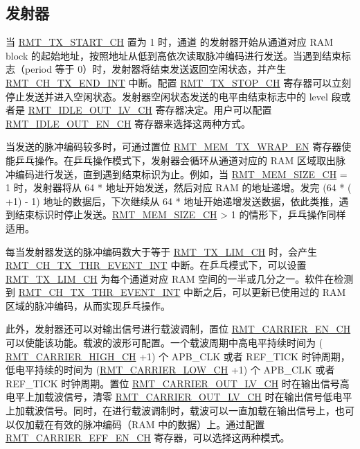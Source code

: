 \documentclass[main\_\_CN.tex]{subfiles}
\begin{document}
\subsection{发射器}
当 \hyperref[fielddesc:RMTREGTXSTARTCHN]{RMT\_TX\_START\_CH} 置为 1 时，通道  的发射器开始从通道对应 RAM block 的起始地址，按照地址从低到高依次读取脉冲编码进行发送。当遇到结束标志（period 等于 0）时，发射器将结束发送返回空闲状态，并产生 \hyperref[int:RMTCHnTXENDINT]{RMT\_CH\_TX\_END\_INT} 中断。配置 \hyperref[fielddesc:RMTREGTXSTOPCHN]{RMT\_TX\_STOP\_CH} 寄存器可以立刻停止发送并进入空闲状态。发射器空闲状态发送的电平由结束标志中的 level 段或者是 \hyperref[fielddesc:RMTREGIDLEOUTLVCHN]{RMT\_IDLE\_OUT\_LV\_CH} 寄存器决定。用户可以配置 \hyperref[fielddesc:RMTREGIDLEOUTENCHN]{RMT\_IDLE\_OUT\_EN\_CH} 寄存器来选择这两种方式。

当发送的脉冲编码较多时，可通过置位 \hyperref[fielddesc:RMTREGMEMTXWRAPEN]{RMT\_MEM\_TX\_WRAP\_EN} 寄存器使能乒乓操作。在乒乓操作模式下，发射器会循环从通道对应的 RAM 区域取出脉冲编码进行发送，直到遇到结束标识为止。例如，当 \hyperref[fielddesc:RMTREGMEMSIZECHN]{RMT\_MEM\_SIZE\_CH} = 1 时，发射器将从 64 *  地址开始发送，然后对应 RAM 的地址递增。发完 (64 * ( +1) - 1) 地址的数据后，下次继续从 64 *  地址开始递增发送数据，依此类推，遇到结束标识时停止发送。\hyperref[fielddesc:RMTREGMEMSIZECHN]{RMT\_MEM\_SIZE\_CH} > 1 的情形下，乒乓操作同样适用。

每当发射器发送的脉冲编码数大于等于 \hyperref[fielddesc:RMTREGTXLIMCHN]{RMT\_TX\_LIM\_CH} 时，会产生 \hyperref[int:RMTCHnTXTHREVENTINT]{RMT\_CH\_TX\_THR\_EVENT\_INT} 中断。在乒乓模式下，可以设置 \hyperref[fielddesc:RMTREGTXLIMCHN]{RMT\_TX\_LIM\_CH} 为每个通道对应 RAM 空间的一半或几分之一。软件在检测到 \hyperref[int:RMTCHnTXTHREVENTINT]{RMT\_CH\_TX\_THR\_EVENT\_INT} 中断之后，可以更新已使用过的 RAM 区域的脉冲编码，从而实现乒乓操作。

此外，发射器还可以对输出信号进行载波调制，置位 \hyperref[fielddesc:RMTREGCARRIERENCHN]{RMT\_CARRIER\_EN\_CH} 可以使能该功能。载波的波形可配置。一个载波周期中高电平持续时间为 ( \hyperref[fielddesc:RMTREGCARRIERHIGHCHN]{RMT\_CARRIER\_HIGH\_CH} +1) 个 APB\_CLK 或者 REF\_TICK 时钟周期，低电平持续的时间为 (\hyperref[fielddesc:RMTREGCARRIERLOWCHN]{RMT\_CARRIER\_LOW\_CH} +1) 个 APB\_CLK 或者 REF\_TICK 时钟周期。置位 \hyperref[fielddesc:RMTREGCARRIEROUTLVCHN]{RMT\_CARRIER\_OUT\_LV\_CH} 时在输出信号高电平上加载波信号，清零 \hyperref[fielddesc:RMTREGCARRIEROUTLVCHN]{RMT\_CARRIER\_OUT\_LV\_CH} 时在输出信号低电平上加载波信号。同时，在进行载波调制时，载波可以一直加载在输出信号上，也可以仅加载在有效的脉冲编码（RAM 中的数据）上。通过配置 \hyperref[fielddesc:RMTREGCARRIEREFFENCHN]{RMT\_CARRIER\_EFF\_EN\_CH} 寄存器，可以选择这两种模式。
\end{document}
